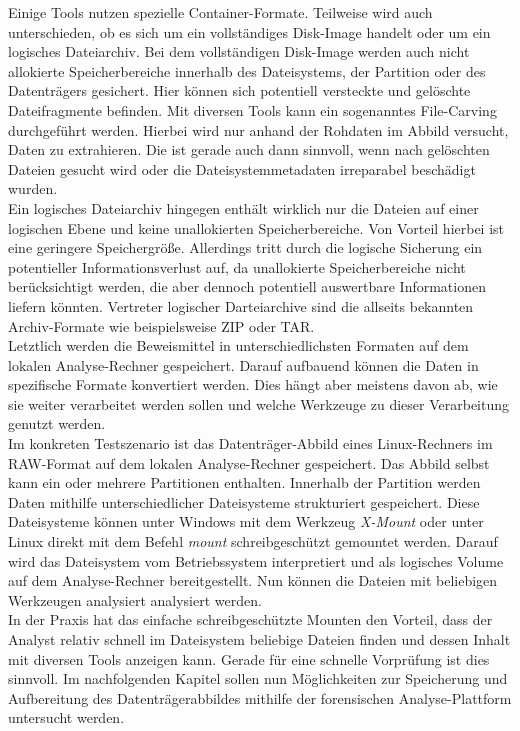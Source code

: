\noindent
Einige Tools nutzen spezielle Container-Formate. Teilweise wird auch unterschieden, ob es sich um ein vollständiges Disk-Image handelt oder um ein logisches Dateiarchiv. Bei dem vollständigen Disk-Image werden auch nicht allokierte Speicherbereiche innerhalb des Dateisystems, der Partition oder des Datenträgers gesichert. Hier können sich potentiell versteckte und gelöschte Dateifragmente befinden. Mit diversen Tools kann ein sogenanntes File-Carving durchgeführt werden. Hierbei wird nur anhand der Rohdaten im Abbild versucht, Daten zu extrahieren. Die ist gerade auch dann sinnvoll, wenn nach gelöschten Dateien gesucht wird oder die Dateisystemmetadaten irreparabel beschädigt wurden.
\\ Ein logisches Dateiarchiv hingegen enthält wirklich nur die Dateien auf einer logischen Ebene und keine unallokierten Speicherbereiche. Von Vorteil hierbei ist eine geringere Speichergröße. Allerdings tritt durch die logische Sicherung ein potentieller Informationsverlust auf, da unallokierte Speicherbereiche nicht berücksichtigt werden, die aber dennoch potentiell auswertbare Informationen liefern könnten. Vertreter logischer Darteiarchive sind die allseits bekannten Archiv-Formate wie beispielsweise ZIP oder TAR.\\

\noindent
Letztlich werden die Beweismittel in unterschiedlichsten Formaten auf dem lokalen Analyse-Rechner gespeichert. Darauf aufbauend können die Daten in spezifische Formate konvertiert werden. Dies hängt aber meistens davon ab, wie sie weiter verarbeitet werden sollen und welche Werkzeuge zu dieser Verarbeitung genutzt werden.\\

\noindent
Im konkreten Testszenario ist das Datenträger-Abbild eines Linux-Rechners im RAW-Format auf dem lokalen Analyse-Rechner gespeichert. Das Abbild selbst kann ein oder mehrere Partitionen enthalten. Innerhalb der Partition werden Daten mithilfe unterschiedlicher Dateisysteme strukturiert gespeichert. Diese Dateisysteme können unter Windows mit dem Werkzeug \textit{X-Mount} oder unter Linux direkt mit dem Befehl \textit{mount} schreibgeschützt gemountet werden. Darauf wird das Dateisystem vom Betriebssystem interpretiert und als logisches Volume auf dem Analyse-Rechner bereitgestellt. Nun können die Dateien mit beliebigen Werkzeugen analysiert analysiert werden.\\

\noindent
In der Praxis hat das einfache schreibgeschützte Mounten den Vorteil, dass der Analyst relativ schnell im Dateisystem beliebige Dateien finden und dessen Inhalt mit diversen Tools anzeigen kann. Gerade für eine schnelle Vorprüfung ist dies sinnvoll. Im nachfolgenden Kapitel sollen nun Möglichkeiten zur Speicherung und Aufbereitung des Datenträgerabbildes mithilfe der forensischen Analyse-Plattform untersucht werden.


